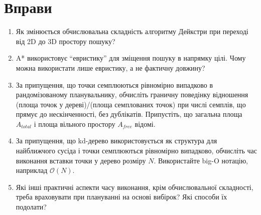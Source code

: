 \section*{Вправи}\small
\begin{enumerate}
\item Як змінюється обчислювальна складність алгоритму Дейкстри при переході від 2D до 3D простору пошуку?
\item A* використовує ``евристику'' для зміщення пошуку в напрямку цілі. Чому можна використати лише евристику, а не фактичну довжину?
\item За припущення, що точки семплюються рівномірно випадково в рандомізованому планувальнику, обчисліть граничну поведінку відношення (площа точок у дереві)/(площа семплованих точок) при числі семплів, що прямує до нескінченності, без дублікатів. Припустіть, що загальна площа $A_{total}$ і площа вільного простору $A_{free}$ відомі.

\item За припущення, що kd-дерево використовується як структура для найближчого сусіда і точки семплюються рівномірно випадково, обчисліть час виконання вставки точки у дерево розміру $N$. Використайте big-O нотацію, наприклад $\mathcal{O}(N)$.

\item Які інші практичні аспекти часу виконання, крім обчислювальної складності, треба враховувати при плануванні на основі вибірок? Які способи їх подолати?


\end{enumerate}
